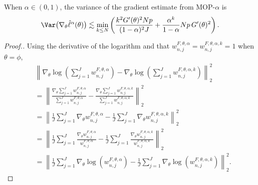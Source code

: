\begin{thm}
    When $\alpha \in (0,1)$, the variance of the gradient estimate from MOP-$\alpha$ is
    \begin{equation}\Var\big(\nabla_\theta \hat\ell^\alpha(\theta)\big) \lesssim \min_{k\leq N} \left(\frac{k^2G'(\theta)^2Np}{(1-\alpha)^2J} + \frac{\alpha^{k}}{1-\alpha}Np \, G'(\theta)^2 \right).
    \end{equation}
\end{thm}
\begin{proof}[Proof.]
Using the derivative of the logarithm and that $w_{n,j}^{F,\theta,\alpha} = w_{n,j}^{F,\theta,\alpha,k} = 1$ when $\theta=\phi$,
\begin{align}
    &\left\lVert\nabla_\theta\log\left(\sum_{j=1}^J w_{n,j}^{F,\theta,\alpha}\right)-\nabla_\theta\log\left(\sum_{j=1}^J w_{n,j}^{F,\theta,\alpha,k}\right)\right\rVert_2^2\\
    &= \left\lVert\frac{\nabla_\theta\sum_{j=1}^J w_{n,j}^{F,\theta,\alpha}}{{\sum_{j=1}^J w_{n,j}^{F,\theta,\alpha}}}-\frac{\nabla_\theta\sum_{j=1}^J w_{n,j}^{F,\theta,\alpha,k}}{{\sum_{j=1}^J w_{n,j}^{F,\theta,\alpha,k}}}\right\rVert_2^2 \\
    &= \left\lVert\frac{1}{J}\sum_{j=1}^J \nabla_\theta w_{n,j}^{F,\theta,\alpha}-\frac{1}{J}\sum_{j=1}^J \nabla_\theta w_{n,j}^{F,\theta,\alpha,k}\right\rVert_2^2 \\
    &= \left\lVert\frac{1}{J}\sum_{j=1}^J \frac{\nabla_\theta w_{n,j}^{F,\theta,\alpha}}{w_{n,j}^{F,\theta,\alpha}}-\frac{1}{J}\sum_{j=1}^J \frac{\nabla_\theta w_{n,j}^{F,\theta,\alpha,k}}{w_{n,j}^{F,\theta,\alpha,k}}\right\rVert_2^2\\
    &= \left\lVert\frac{1}{J}\sum_{j=1}^J \nabla_\theta \log\left(w_{n,j}^{F,\theta,\alpha}\right)-\frac{1}{J}\sum_{j=1}^J \nabla_\theta \log\left(w_{n,j}^{F,\theta,\alpha,k}\right)\right\rVert_2^2.
\end{align}


\end{proof}
